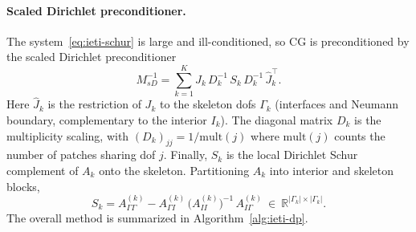 \documentclass{article}
\newcommand{\R}{\mathbb{R}}
\newcommand{\skel}{\Gamma} %
\newcommand{\npatch}{K} %
\newcommand{\Aloc}[1]{A_{#1}}                    %
\newcommand{\Jloc}[1]{J_{#1}}                    %
\newcommand{\Jskel}[1]{\widehat{J}_{#1}}         %
\newcommand{\Sloc}[1]{S_{#1}}                    %
\newcommand{\Psd}{M_{sD}^{-1}}                   %
\newcommand{\Dmult}[1]{D_{#1}}                   %
\theoremstyle{plain}
\numberwithin{equation}{section}
\begin{document}
\paragraph{Scaled Dirichlet preconditioner.}
The system~\eqref{eq:ieti-schur} is large and ill-conditioned, so CG is
preconditioned by the scaled Dirichlet preconditioner~\cite{kleiss2012ieti,
    pechstein2013finite}
\begin{equation}
    \Psd = \sum_{k=1}^{\npatch}
    \Jskel{k}\, \Dmult{k}^{-1}\, \Sloc{k}\, \Dmult{k}^{-1}\, \Jskel{k}^{\top}.
    \label{eq:scaled-dirichlet}
\end{equation}
Here $\Jskel{k}$ is the restriction of $\Jloc{k}$ to the skeleton dofs $\skel_k$
(interfaces and Neumann boundary, complementary to the interior $I_k$).
The diagonal matrix $\Dmult{k}$ is the multiplicity scaling, with
$(\Dmult{k})_{jj} = 1/\mathrm{mult}(j)$ where $\mathrm{mult}(j)$ counts the
number of patches sharing dof $j$.
Finally, $\Sloc{k}$ is the local Dirichlet Schur complement of $\Aloc{k}$ onto
the skeleton. Partitioning $\Aloc{k}$ into interior and skeleton blocks,
\begin{equation}
    \Sloc{k} = A^{(k)}_{\skel\skel}
    - A^{(k)}_{\skel I}\, \bigl(A^{(k)}_{II}\bigr)^{-1}\, A^{(k)}_{I\skel}
    \ \in\ \R^{|\skel_k| \times |\skel_k|}.
    \label{eq:local-schur}
\end{equation}
The overall method is summarized in Algorithm~\ref{alg:ieti-dp}.
\end{document}
